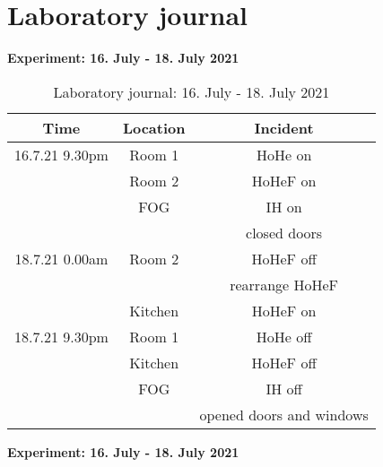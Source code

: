 \section{Laboratory journal}
\label{sec:appendix:Laborbuch}
\textbf{Experiment: 16. July - 18. July 2021}
\begin{table}[H]
    \centering
    \begin{tabular}{c|c|c}
        \textbf{Time} & \textbf{Location} & \textbf{Incident }\\
        \hline
        \hline
        16.7.21 9.30pm & Room 1 & HoHe on\\
        & Room 2 & HoHeF on\\
        & FOG & IH on\\
        && closed doors\\
        \hline
        18.7.21 0.00am & Room 2 & HoHeF off\\ 
        && rearrange HoHeF \\
        & Kitchen & HoHeF on\\
        \hline
        18.7.21 9.30pm & Room 1 & HoHe off\\
        & Kitchen & HoHeF off\\
        & FOG & IH off\\
        && opened doors and windows\\
    \end{tabular}
    \caption{Laboratory journal: 16. July - 18. July 2021}
    \label{tab:Experiment1app}
\end{table}
\textbf{Experiment: 16. July - 18. July 2021}
